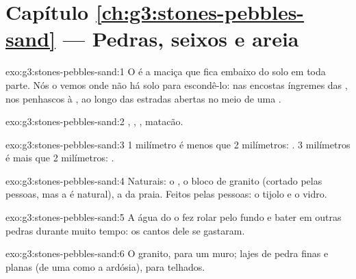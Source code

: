 \section*{Capítulo \ref{ch:g3:stones-pebbles-sand} --- Pedras, seixos e areia}

\begin{solution}{exo:g3:stones-pebbles-sand:1}
O  é a  maciça que fica embaixo do solo em toda
parte. Nós o vemos onde não há solo para escondê-lo: nas encostas íngremes
das , nos penhascos à , ao longo das estradas abertas no
meio de uma .
\end{solution}

\begin{solution}{exo:g3:stones-pebbles-sand:2}
, , , matacão.
\end{solution}

\begin{solution}{exo:g3:stones-pebbles-sand:3}
1 milímetro é menos que 2 milímetros: . 3 milímetros é mais que
2 milímetros: .
\end{solution}

\begin{solution}{exo:g3:stones-pebbles-sand:4}
Naturais: o , o bloco de granito (cortado pelas pessoas, mas a  é
natural), a  da praia. Feitos pelas pessoas: o tijolo e o vidro.
\end{solution}

\begin{solution}{exo:g3:stones-pebbles-sand:5}
A água do  o fez rolar pelo fundo e bater em outras pedras durante
muito tempo: os cantos dele se gastaram.
\end{solution}

\begin{solution}{exo:g3:stones-pebbles-sand:6}
O granito, para um muro; lajes de pedra finas e planas (de uma  como a ardósia), para telhados.
\end{solution}

